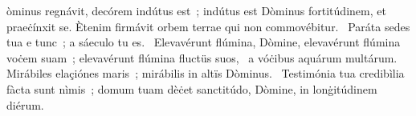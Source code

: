 { }
{%
òminus regnávit, decórem indútus est~; indútus est Dòminus fortitúdinem, et praeċínxit se. Ètenim firmávit orbem terrae qui non commovébitur. 
~Paráta sedes tua e tunc~; a sáeculo tu es. 
~Elevavérunt flúmina, Dòmine, elevavérunt flúmina voċem suam~; elevavérunt flúmina fluctüs suos, 
~a vóċibus aquárum multárum. Mirábiles elaçiónes maris~; mirábilis in altïs Dòminus. 
~Testimónia tua credibìlia fàcta sunt nìmis~; domum tuam dèċet sanctitúdo, Dòmine, in lonġitúdinem diérum. 
}
